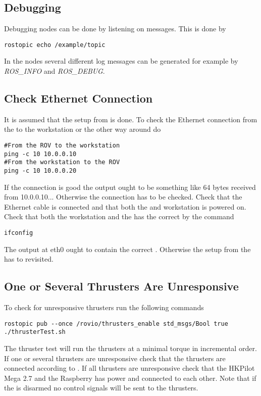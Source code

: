 \subsection{\abbrROS Debugging}
Debugging \abbrROS nodes can be done by listening on \abbrROS messages. This is done by 
\begin{lstlisting}
rostopic echo /example/topic
\end{lstlisting}
In the nodes several different log messages can be generated for example by \textit{ROS\_INFO} and \textit{ROS\_DEBUG}.

\subsection{Check Ethernet Connection}
It is assumed that the setup from  is done. To check the Ethernet connection from the \abbrROV to the workstation or the other way around do
\begin{lstlisting}
#From the ROV to the workstation
ping -c 10 10.0.0.10 
#From the workstation to the ROV
ping -c 10 10.0.0.20
\end{lstlisting}
If the connection is good the output ought to be something like 64 bytes received from 10.0.0.10... Otherwise the connection has to be checked. Check that the Ethernet cable is connected and that both the \abbrROV and workstation is powered on. Check that both the workstation and the \abbrROV has the correct \abbrIP by the command
\begin{lstlisting}
ifconfig
\end{lstlisting}
The output at eth0 ought to contain the correct \abbrIP. Otherwise the setup from the  has to revisited.

\subsection{One or Several Thrusters Are Unresponsive}\label{subsec:unresponsive}
To check for unresponsive thrusters run the following commands 
\begin{lstlisting}
rostopic pub --once /rovio/thrusters_enable std_msgs/Bool true
./thrusterTest.sh
\end{lstlisting}
The thruster test will run the thrusters at a minimal torque in incremental order. If one or several thrusters are unresponsive check that the thrusters are connected according to . If all thrusters are unresponsive check that the HKPilot Mega 2.7 and the Raspberry has power and connected to each other. Note that if the \abbrROV is disarmed no control signals will be sent to the thrusters.

